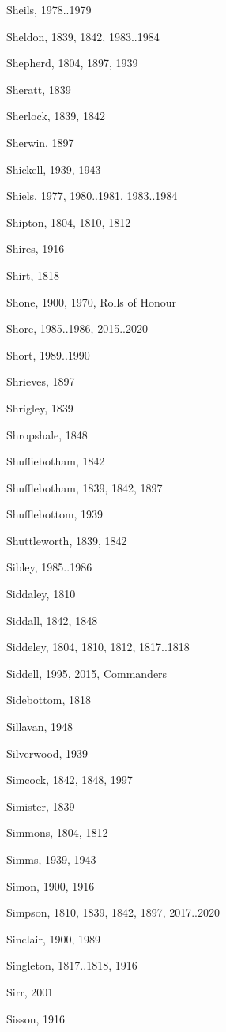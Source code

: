 \begin{theindex}
\item Sheils, 1978..1979
\item Sheldon, 1839, 1842, 1983..1984
\item Shepherd, 1804, 1897, 1939
\item Sheratt, 1839
\item Sherlock, 1839, 1842
\item Sherwin, 1897
\item Shickell, 1939, 1943
\item Shiels, 1977, 1980..1981, 1983..1984
\item Shipton, 1804, 1810, 1812
\item Shires, 1916
\item Shirt, 1818
\item Shone, 1900, 1970, Rolls of Honour
\item Shore, 1985..1986, 2015..2020
\item Short, 1989..1990
\item Shrieves, 1897
\item Shrigley, 1839
\item Shropshale, 1848
\item Shuffiebotham, 1842
\item Shufflebotham, 1839, 1842, 1897
\item Shufflebottom, 1939
\item Shuttleworth, 1839, 1842
\item Sibley, 1985..1986
\item Siddaley, 1810
\item Siddall, 1842, 1848
\item Siddeley, 1804, 1810, 1812, 1817..1818
\item Siddell, 1995, 2015, Commanders
\item Sidebottom, 1818
\item Sillavan, 1948
\item Silverwood, 1939
\item Simcock, 1842, 1848, 1997
\item Simister, 1839
\item Simmons, 1804, 1812
\item Simms, 1939, 1943
\item Simon, 1900, 1916
\item Simpson, 1810, 1839, 1842, 1897, 2017..2020
\item Sinclair, 1900, 1989
\item Singleton, 1817..1818, 1916
\item Sirr, 2001
\item Sisson, 1916

\end{theindex}
